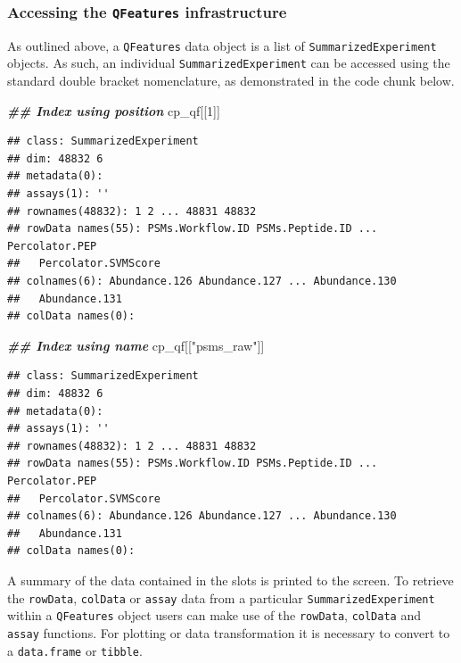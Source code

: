 \documentclass[9pt,a4paper,]{extarticle}
\newenvironment{Shaded}{\begin{snugshade}}{\end{snugshade}}
\newcommand{\DecValTok}[1]{\textcolor[rgb]{0.00,0.00,0.81}{#1}}
\newcommand{\DocumentationTok}[1]{\textcolor[rgb]{0.56,0.35,0.01}{\textbf{\textit{#1}}}}
\newcommand{\NormalTok}[1]{#1}
\newcommand{\StringTok}[1]{\textcolor[rgb]{0.31,0.60,0.02}{#1}}
\begin{document}
\subsubsection{\texorpdfstring{Accessing the \texttt{QFeatures} infrastructure}{Accessing the QFeatures infrastructure}}\label{accessing-the-qfeatures-infrastructure}

As outlined above, a \texttt{QFeatures} data object is a list of \texttt{SummarizedExperiment}
objects. As such, an individual \texttt{SummarizedExperiment} can be accessed using
the standard double bracket nomenclature, as demonstrated in the code chunk
below.

\begin{Shaded}
\begin{Highlighting}[]
\DocumentationTok{\#\# Index using position}
\NormalTok{cp\_qf[[}\DecValTok{1}\NormalTok{]]}
\end{Highlighting}
\end{Shaded}

\begin{verbatim}
## class: SummarizedExperiment 
## dim: 48832 6 
## metadata(0):
## assays(1): ''
## rownames(48832): 1 2 ... 48831 48832
## rowData names(55): PSMs.Workflow.ID PSMs.Peptide.ID ... Percolator.PEP
##   Percolator.SVMScore
## colnames(6): Abundance.126 Abundance.127 ... Abundance.130
##   Abundance.131
## colData names(0):
\end{verbatim}

\begin{Shaded}
\begin{Highlighting}[]
\DocumentationTok{\#\# Index using name}
\NormalTok{cp\_qf[[}\StringTok{"psms\_raw"}\NormalTok{]]}
\end{Highlighting}
\end{Shaded}

\begin{verbatim}
## class: SummarizedExperiment 
## dim: 48832 6 
## metadata(0):
## assays(1): ''
## rownames(48832): 1 2 ... 48831 48832
## rowData names(55): PSMs.Workflow.ID PSMs.Peptide.ID ... Percolator.PEP
##   Percolator.SVMScore
## colnames(6): Abundance.126 Abundance.127 ... Abundance.130
##   Abundance.131
## colData names(0):
\end{verbatim}

A summary of the data contained in the slots is printed to the screen.
To retrieve the \texttt{rowData}, \texttt{colData} or \texttt{assay} data from a particular
\texttt{SummarizedExperiment} within a \texttt{QFeatures} object users can make use of the
\texttt{rowData}, \texttt{colData} and \texttt{assay} functions. For plotting or data transformation
it is necessary to convert to a \texttt{data.frame} or \texttt{tibble}.
\end{document}
